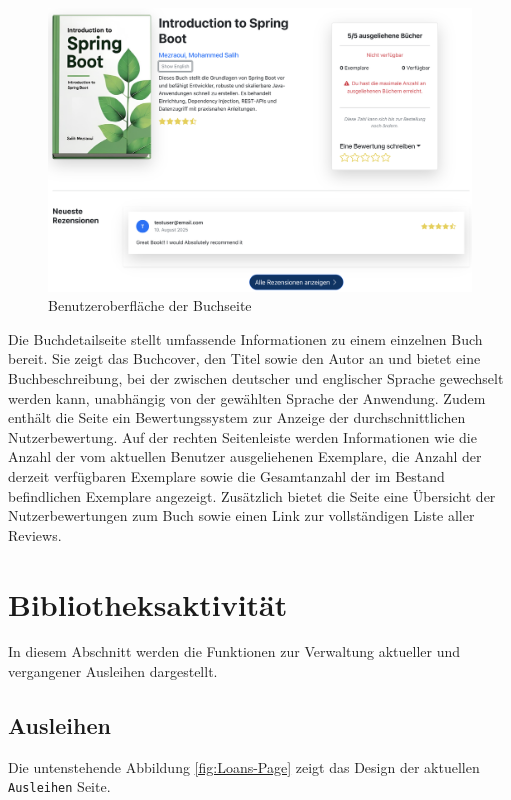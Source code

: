 \begin{figure}[H]
	\centering
	\includegraphics[width=1.0\textwidth]{images/UI-screenshots/Book-Page.png}
	\caption{Benutzeroberfläche der Buchseite}
	\label{fig:Book-page}
\end{figure}

\noindent Die Buchdetailseite stellt umfassende Informationen zu einem einzelnen Buch bereit. Sie zeigt das Buchcover, den Titel sowie den Autor an und bietet eine Buchbeschreibung, bei der zwischen deutscher und englischer Sprache gewechselt werden kann, unabhängig von der gewählten Sprache der Anwendung. Zudem enthält die Seite ein Bewertungssystem zur Anzeige der durchschnittlichen Nutzerbewertung. Auf der rechten Seitenleiste werden Informationen wie die Anzahl der vom aktuellen Benutzer ausgeliehenen Exemplare, die Anzahl der derzeit verfügbaren Exemplare sowie die Gesamtanzahl der im Bestand befindlichen Exemplare angezeigt. Zusätzlich bietet die Seite eine Übersicht der Nutzerbewertungen zum Buch sowie einen Link zur vollständigen Liste aller Reviews.

\section{Bibliotheksaktivität}
In diesem Abschnitt werden die Funktionen zur Verwaltung aktueller und vergangener Ausleihen dargestellt.

\subsection{Ausleihen}
Die untenstehende Abbildung \ref{fig:Loans-Page} zeigt das Design der aktuellen \texttt{Ausleihen} Seite. 

